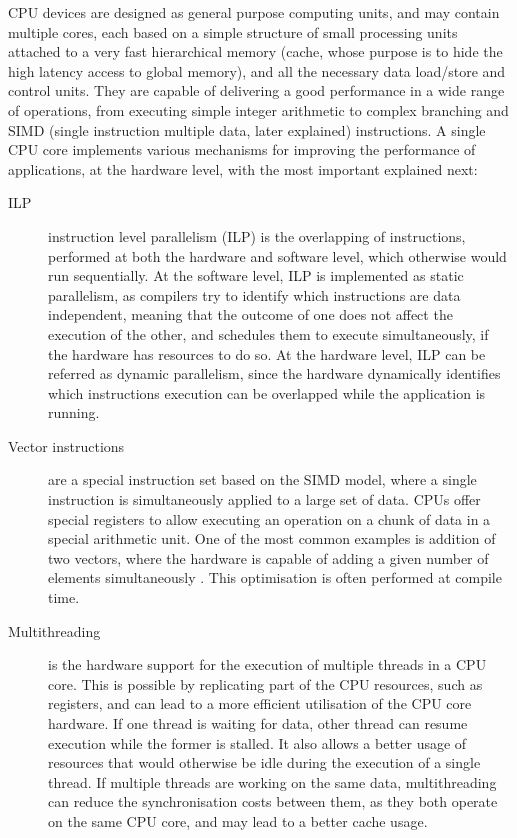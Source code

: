CPU devices are designed as general purpose computing units, and may contain multiple cores, each based on a simple structure of small processing units attached to a very fast hierarchical memory (cache, whose purpose is to hide the high latency access to global memory), and all the necessary data load/store and control units. They are capable of delivering a good performance in a wide range of operations, from executing simple integer arithmetic to complex branching and SIMD (single instruction multiple data, later explained) instructions. A single CPU core implements various mechanisms for improving the performance of applications, at the hardware level, with the most important explained next:

\begin{center}
	\begin{description}
		\item[ILP] instruction level parallelism (ILP) is the overlapping of instructions, performed at both the hardware and software level, which otherwise would run sequentially. At the software level, ILP is implemented as static parallelism, as compilers try to identify which instructions are data independent, meaning that the outcome of one does not affect the execution of the other, and schedules them to execute simultaneously, if the hardware has resources to do so. At the hardware level, ILP can be referred as dynamic parallelism, since the hardware dynamically identifies which instructions execution can be overlapped while the application is running.

		\item[Vector instructions] are a special instruction set based on the SIMD model, where a single instruction is simultaneously applied to a large set of data. CPUs offer special registers to allow executing an operation on a chunk of data in a special arithmetic unit. One of the most common examples is addition of two vectors, where the hardware is capable of adding a given number of elements simultaneously . This optimisation is often performed at compile time.

		\item[Multithreading] is the hardware support for the execution of multiple threads in a CPU core. This is possible by replicating part of the CPU resources, such as registers, and can lead to a more efficient utilisation of the CPU core hardware. If one thread is waiting for data, other thread can resume execution while the former is stalled. It also allows a better usage of resources that would otherwise be idle during the execution of a single thread. If multiple threads are working on the same data, multithreading can reduce the synchronisation costs between them, as they both operate on the same CPU core, and may lead to a better cache usage.
	\end{description}
\end{center}

